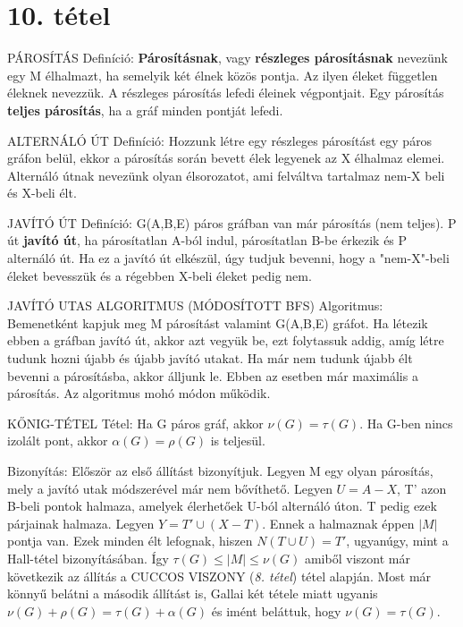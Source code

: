 \section{10. tétel}

\begin{definicio}{
PÁROSÍTÁS Definíció}: \textbf{Párosításnak}, vagy \textbf{részleges párosításnak} nevezünk egy M élhalmazt, ha semelyik két élnek közös pontja. Az ilyen éleket független éleknek nevezzük. A részleges párosítás lefedi éleinek végpontjait. Egy párosítás \textbf{teljes párosítás}, ha a gráf minden pontját lefedi.
\end{definicio}
\begin{definicio}{
ALTERNÁLÓ ÚT Definíció}: Hozzunk létre egy részleges párosítást egy páros gráfon belül, ekkor a párosítás során bevett élek legyenek az X élhalmaz elemei. Alternáló útnak nevezünk olyan élsorozatot, ami felváltva tartalmaz nem-X beli és X-beli élt.
\end{definicio}
\begin{definicio}{
JAVÍTÓ ÚT Definíció}: G(A,B,E) páros gráfban van már párosítás (nem teljes). P út \textbf{javító út}, ha párosítatlan A-ból indul, párosítatlan B-be érkezik és P alternáló út. Ha ez a javító út elkészül, úgy tudjuk bevenni, hogy a "nem-X"-beli éleket bevesszük és a régebben X-beli éleket pedig nem.
\end{definicio}
\begin{definicio}{
JAVÍTÓ UTAS ALGORITMUS (MÓDOSÍTOTT BFS) Algoritmus}: Bemenetként kapjuk meg M párosítást valamint G(A,B,E) gráfot. Ha létezik ebben a gráfban javító út, akkor azt vegyük be, ezt folytassuk addig, amíg létre tudunk hozni újabb és újabb javító utakat. Ha már nem tudunk újabb élt bevenni a párosításba, akkor álljunk le. Ebben az esetben már maximális a párosítás. Az algoritmus mohó módon működik.
\end{definicio}
\begin{tetel}{
KŐNIG-TÉTEL Tétel}: Ha G páros gráf, akkor $\nu(G) = \tau(G)$. Ha G-ben nincs izolált pont, akkor $\alpha(G) = \rho(G)$ is teljesül.
\end{tetel}
\begin{leftbar}
Bizonyítás: Először az első állítást bizonyítjuk. Legyen M egy olyan párosítás, mely a javító utak módszerével már nem bővíthető. Legyen $U = A - X$, T' azon B-beli pontok halmaza, amelyek élerhetőek U-ból alternáló úton. T pedig ezek párjainak halmaza. Legyen $Y = T' \cup (X - T)$. Ennek a halmaznak éppen $|M|$ pontja van. Ezek minden élt lefognak, hiszen $N(T\cup U) = T'$, ugyanúgy, mint a Hall-tétel bizonyításában. Így $\tau(G) \leq |M| \leq \nu(G)$ amiből viszont már következik az állítás a CUCCOS VISZONY (\textit{8. tétel}) tétel alapján. Most már könnyű belátni a második állítást is, Gallai két tétele miatt ugyanis $\nu(G) + \rho(G) = \tau(G) + \alpha(G)$ és imént beláttuk, hogy $\nu(G) = \tau(G)$.
\end{leftbar}
